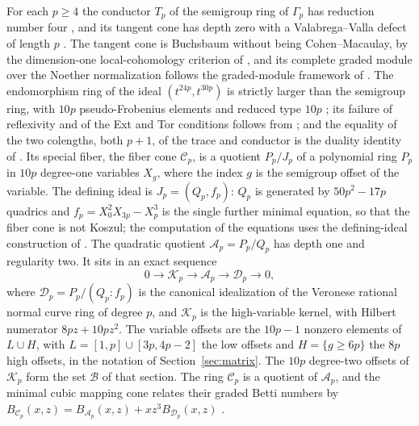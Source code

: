 \documentclass[11pt]{article}
\theoremstyle{definition}
\theoremstyle{remark}
\begin{document}
For each $p\geq4$ the conductor $T_p$ of the semigroup ring of $\Gamma_p$ has
reduction number four \cite{NorthcottRees}, and its tangent cone has depth zero
with a Valabrega--Valla defect \cite{ValabregaValla} of length $p$
\cite{CAOSMain}. The tangent cone is Buchsbaum without being Cohen--Macaulay, by the
dimension-one local-cohomology criterion of \cite{DAnnaMezzasalma,DAnnaMicale}, and its
complete graded module over the Noether normalization follows the graded-module framework of
\cite{CortadellasZarzuelaA,CortadellasZarzuelaB}. The endomorphism ring of the ideal
$(t^{24p},t^{30p})$ is strictly larger than the semigroup ring, with $10p$ pseudo-Frobenius elements
and reduced type $10p$ \cite{MaitraMukundan}; its failure of reflexivity and of the Ext and Tor
conditions follows from \cite{DeyLyle}; and the equality of the two colengths, both $p+1$, of the
trace and conductor is the duality identity of \cite{HerzogKumashiro}. Its special fiber, the fiber cone $\mathcal C_p$, is a quotient
$P_p/J_p$ of a polynomial ring $P_p$ in $10p$ degree-one variables $X_g$, where
the index $g$ is the semigroup offset of the variable. The defining ideal is
$J_p=(Q_p,f_p)$: $Q_p$ is generated by $50p^2-17p$ quadrics and
$f_p=X_0^2X_{3p}-X_p^3$ is the single further minimal equation, so that the fiber
cone is not Koszul; the computation of the equations uses the defining-ideal
construction of \cite{AbdolmalekiKumashiro}. The quadratic quotient
$\mathcal A_p=P_p/Q_p$ has depth one and regularity two. It sits in an exact
sequence
\begin{equation}\label{eq:ses}
 0\longrightarrow\mathcal K_p\longrightarrow\mathcal A_p\longrightarrow
 \mathcal D_p\longrightarrow0,
\end{equation}
where $\mathcal D_p=P_p/(Q_p{:}f_p)$ is the canonical idealization of the
Veronese rational normal curve ring of degree $p$, and $\mathcal K_p$ is the
high-variable kernel, with Hilbert numerator $8pz+10pz^2$. The variable offsets
are the $10p-1$ nonzero elements of $L\cup H$, with $L=[1,p]\cup[3p,4p-2]$ the
low offsets and $H=\{g\geq6p\}$ the $8p$ high offsets, in the notation of
Section~\ref{sec:matrix}. The $10p$ degree-two offsets of $\mathcal K_p$ form
the set $\mathcal B$ of that section. The ring $\mathcal C_p$ is a quotient of
$\mathcal A_p$, and the minimal cubic mapping cone relates their graded Betti
numbers by
$B_{\mathcal C_p}(x,z)=B_{\mathcal A_p}(x,z)+xz^3B_{\mathcal D_p}(x,z)$
\cite{CAOSMain}.
\end{document}
